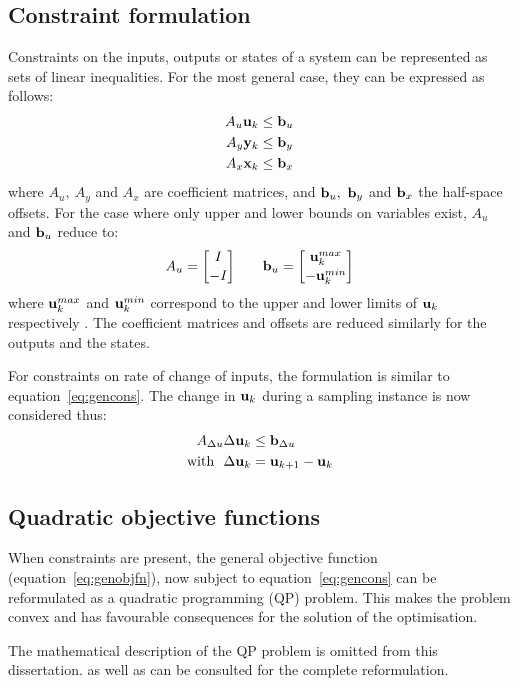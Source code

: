 \subsection{Constraint formulation}
Constraints on the inputs, outputs or states of a system can be represented as sets of linear inequalities.
For the most general case, they can be expressed as follows:
\begin{align}
  \label{eq:gencons}
  A_u{\bf {u}}_k &\leq {\bf {b}}_u \notag \\
  A_y{\bf {y}}_k &\leq {\bf {b}}_y \\
  A_x{\bf {x}}_k &\leq {\bf {b}}_x \notag
\end{align}
where $A_u,~A_y$ and $A_x$ are coefficient matrices, and ${\bf {b}}_u,~{\bf {b}}_y$ and ${\bf {b}}_x$ the half-space offsets.
For the case where only upper and lower bounds on variables exist, $A_u$ and ${\bf {b}}_u$ reduce to:
\begin{align*}
  A_u={I\brack -I} \qquad {\bf {b}}_u={{\bf {u}}^{max}_k \brack -{\bf {u}}^{min}_k}
\end{align*}
where ${\bf {u}}^{max}_k$ and ${\bf {u}}^{min}_k$ correspond to the upper and lower limits of ${\bf {u}}_k$ respectively \citep[6]{rawlings}. 
The coefficient matrices and offsets are reduced similarly for the outputs and the states.

For constraints on rate of change of inputs, the formulation is similar to equation~\ref{eq:gencons}.
The change in ${\bf {u}}_k$ during a sampling instance is now considered thus:
\begin{align*}
  A_{\Delta u}\Delta {\bf {u}}_k &\leq {\bf {b}}_{\Delta u} \notag \\
  \text{with}~~ \Delta {\bf {u}}_k &= {\bf {u}}_{k+1}-{\bf {u}}_k
\end{align*}

\subsection{Quadratic objective functions}\label{sec:conobjfn}
When constraints are present, the general objective function (equation~\ref{eq:genobjfn}), now subject to equation~\ref{eq:gencons} can be reformulated as a quadratic programming (QP) problem.
This makes the problem convex and has favourable consequences for the solution of the optimisation.

The mathematical description of the QP problem is omitted from this dissertation.
\citet[81-83]{maciejowskimpc} as well as \citet[489-490]{rawlings} can be consulted for the complete reformulation.

